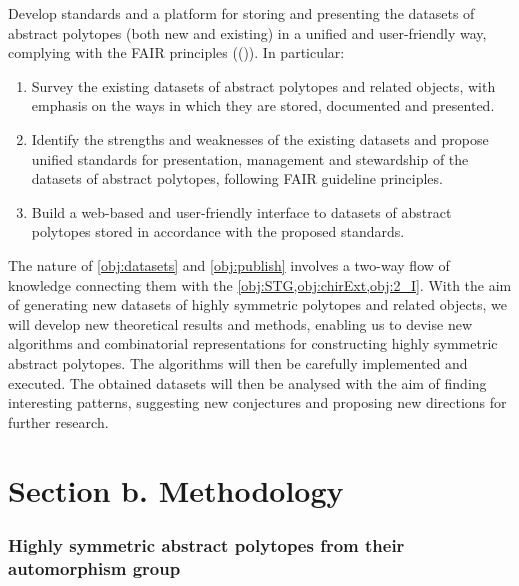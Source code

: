 \documentclass[a4paper,12pt,english]{article}
\begin{document}
\begin{obj}\label{obj:publish}
Develop standards and a platform for storing and presenting the datasets of abstract polytopes
 (both new and existing) in a unified and user-friendly way, complying with the FAIR principles ((\cite{BercKohRab2020_DeepFairMathematics,WDAAABBBSB2016_FairGuidingPrinciples})). In particular:

\begin{enumerate}[label=\textit{(\roman*)}]

\item  Survey the existing datasets of abstract polytopes and related objects, with emphasis on the ways in which they are stored, documented and presented.
\item
Identify the strengths and weaknesses of the existing datasets and propose unified standards for presentation, management and stewardship of the
datasets of abstract polytopes, following FAIR guideline principles.
\item Build a web-based and user-friendly interface to datasets of abstract polytopes stored in accordance with the proposed standards.

\end{enumerate}
\end{obj}

The nature of \cref{obj:datasets} and \cref{obj:publish} involves a two-way flow of knowledge connecting them with the \cref{obj:STG,obj:chirExt,obj:2_I}.
With the aim of generating new datasets of highly symmetric polytopes and related objects, we will develop new theoretical results and methods, enabling us to devise new algorithms and combinatorial representations for constructing highly symmetric abstract polytopes.
The algorithms will then be carefully implemented and executed.
The obtained datasets will then be analysed with the aim of finding interesting patterns, suggesting new conjectures and proposing new directions for further research. 



\section*{Section b. Methodology}

\subsubsection*{Highly symmetric abstract polytopes from their automorphism group}
\end{document}
